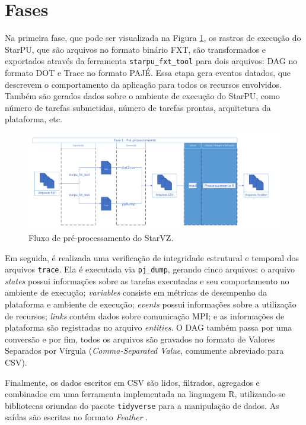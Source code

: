 \section{Fases}\label{sect:starvz-phases}

Na primeira fase, que pode ser visualizada na Figura \ref{fig:starvz-workflow1}, 
os rastros de execução do StarPU, que são arquivos no formato binário FXT, são 
transformados e exportados através da ferramenta \texttt{starpu\_fxt\_tool} para 
dois arquivos: DAG no formato DOT e Trace no formato PAJÉ. Essa etapa gera 
eventos datados, que descrevem o comportamento da aplicação para todos os 
recursos envolvidos. Também são gerados dados sobre o ambiente de execução do 
StarPU, como número de tarefas submetidas, número de tarefas prontas, 
arquitetura da plataforma, etc.

\begin{figure}[ht]
 \centerline{\includegraphics[width=1\textwidth]{./img/step1-simpler.pdf}}
 \caption{Fluxo de pré-processamento do StarVZ.}
 \label{fig:starvz-workflow1}
\end{figure}

Em seguida, é realizada uma verificação de integridade estrutural e temporal dos
arquivos \texttt{trace}. Ela é executada via \texttt{pj\_dump}, gerando cinco 
arquivos: o arquivo \textit{states} possui informações sobre as tarefas 
executadas e seu  comportamento no ambiente de execução; \textit{variables}
consiste em métricas de desempenho da plataforma e ambiente de execução; 
\textit{events} possui informações sobre a utilização de recursos; 
\textit{links} contém dados sobre comunicação MPI; e as informações de 
plataforma são registradas no arquivo \textit{entities}. O DAG também passa por 
uma conversão e por fim, todos os arquivos são gravados no formato de Valores 
Separados por Vírgula (\textit{Comma-Separated Value}, comumente abreviado para 
CSV).

Finalmente, os dados escritos em CSV são lidos, filtrados, agregados e 
combinados em uma ferramenta implementada na linguagem R, utilizando-se 
bibliotecas oriundas do pacote \texttt{tidyverse} para a manipulação de dados. 
As saídas são escritas no formato \textit{Feather} \cite{ref:feather}.

